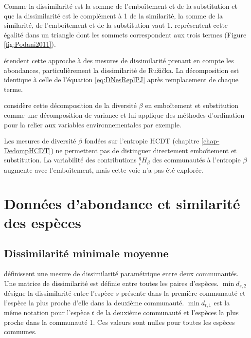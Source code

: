 \documentclass[
  11pt,
  french,
  a4paper,
  extrafontsizes,onecolumn,openright
  ]{memoir}
\begin{document}
\normalsize

Comme la dissimilarité est la somme de l'emboîtement et de la substitution et que la dissimilarité est le complément à 1 de la similarité, la somme de la similarité, de l'emboîtement et de la substitution vaut 1.
\textcite{Podani2011} représentent cette égalité dans un triangle dont les sommets correspondent aux trois termes (Figure \ref{fig:Podani2011}).

\textcite{Podani2013} étendent cette approche à des mesures de dissimilarité prenant en compte les abondances, particulièrement la dissimilarité de Ružička.
La décomposition est identique à celle de l'équation \eqref{eq:DNesReplPJ} après remplacement de chaque terme.

\textcite{Legendre2014} considère cette décomposition de la diversité \(\beta\) en emboîtement et substitution comme une décomposition de variance et lui applique des méthodes d'ordination pour la relier aux variables environnementales par exemple.

Les mesures de diversité \(\beta\) fondées sur l'entropie HCDT (chapitre \ref{chap-DedompHCDT}) ne permettent pas de distinguer directement emboîtement et substitution.
La variabilité des contributions \(^{q}_{i}\!H_{\beta}\) des communautés à l'entropie \(\beta\) augmente avec l'emboîtement, mais cette voie n'a pas été explorée.

\hypertarget{donnuxe9es-dabondance-et-similarituxe9-des-espuxe8ces}{%
\section{Données d'abondance et similarité des espèces}\label{donnuxe9es-dabondance-et-similarituxe9-des-espuxe8ces}}

\hypertarget{dissimilarituxe9-minimale-moyenne}{%
\subsection{Dissimilarité minimale moyenne}\label{dissimilarituxe9-minimale-moyenne}}

\textcite{Ricotta2010} définissent une mesure de dissimilarité paramétrique entre deux communautés.
Une matrice de dissimilarité est définie entre toutes les paires d'espèces.
\(\min{d_{s,2}}\) désigne la dissimilarité entre l'espèce \(s\) présente dans la première communauté et l'espèce la plus proche d'elle dans la deuxième communauté.
\(\min{d_{t,1}}\) est la même notation pour l'espèce \(t\) de la deuxième communauté et l'espèces la plus proche dans la communauté 1.
Ces valeurs sont nulles pour toutes les espèces communes.
\end{document}
